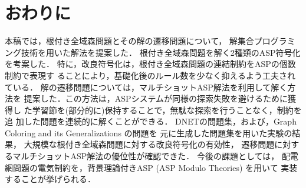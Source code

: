 ﻿\section{おわりに}\label{chap:conc}

本稿では，根付き全域森問題とその解の遷移問題について，
解集合プログラミング技術を用いた解法を提案した．
%
根付き全域森問題を解く2種類のASP符号化を考案した．
特に，改良符号化は，根付き全域森問題の連結制約をASPの個数制約で表現す
ることにより，基礎化後のルール数を少なく抑えるよう工夫されている．
%
解の遷移問題については，マルチショットASP解法を利用して解く方法を
提案した．この方法は，ASPシステムが同様の探索失敗を避けるために獲得し
た学習節を(部分的に)保持することで，無駄な探索を行うことなく，制約を追
加した問題を連続的に解くことができる．
%
DNETの問題集，および，Graph Coloring and its Generalizations の問題を
元に生成した問題集を用いた実験の結果，
大規模な根付き全域森問題に対する改良符号化の有効性，
遷移問題に対するマルチショットASP解法の優位性が確認できた．
%
今後の課題としては，
配電網問題の電気制約を，背景理論付きASP (ASP Modulo Theories) を用いて
実装することが挙げられる．

